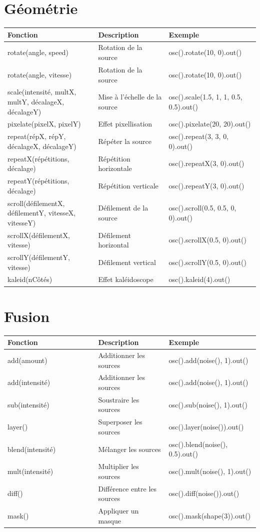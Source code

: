 \documentclass[9pt,oneside]{amsart}
\begin{document}
\section*{Géométrie}
\begin{tabular}{L{0.36\linewidth}L{0.28\linewidth}L{0.40\linewidth}}
\toprule
\textbf{Fonction} & \textbf{Description} & \textbf{Exemple} \\
\midrule
rotate(angle, speed) & Rotation de la source & osc().rotate(10, 0).out() \\
rotate(angle, vitesse) & Rotation de la source & osc().rotate(10, 0).out() \\
scale(intensité, multX, multY, décalageX, décalageY) & Mise à l'échelle de la source & osc().scale(1.5, 1, 1, 0.5, 0.5).out() \\
pixelate(pixelX, pixelY) & Effet pixellisation & osc().pixelate(20, 20).out() \\
repeat(répX, répY, décalageX, décalageY) & Répéter la source & osc().repeat(3, 3, 0, 0).out() \\
repeatX(répétitions, décalage) & Répétition horizontale & osc().repeatX(3, 0).out() \\
repeatY(répétitions, décalage) & Répétition verticale & osc().repeatY(3, 0).out() \\
scroll(défilementX, défilementY, vitesseX, vitesseY) & Défilement de la source & osc().scroll(0.5, 0.5, 0, 0).out() \\
scrollX(défilementX, vitesse) & Défilement horizontal & osc().scrollX(0.5, 0).out() \\
scrollY(défilementY, vitesse) & Défilement vertical & osc().scrollY(0.5, 0).out() \\
kaleid(nCôtés) & Effet kaléidoscope & osc().kaleid(4).out() \\
\bottomrule
\end{tabular}

\section*{Fusion}
\begin{tabular}{L{0.36\linewidth}L{0.28\linewidth}L{0.40\linewidth}}
\toprule
\textbf{Fonction} & \textbf{Description} & \textbf{Exemple} \\
\midrule
add(amount) & Additionner les sources & osc().add(noise(), 1).out() \\
add(intensité) & Additionner les sources & osc().add(noise(), 1).out() \\
sub(intensité) & Soustraire les sources & osc().sub(noise(), 1).out() \\
layer() & Superposer les sources & osc().layer(noise()).out() \\
blend(intensité) & Mélanger les sources & osc().blend(noise(), 0.5).out() \\
mult(intensité) & Multiplier les sources & osc().mult(noise(), 1).out() \\
diff() & Différence entre les sources & osc().diff(noise()).out() \\
mask() & Appliquer un masque & osc().mask(shape(3)).out() \\
\bottomrule
\end{tabular}
\end{document}
